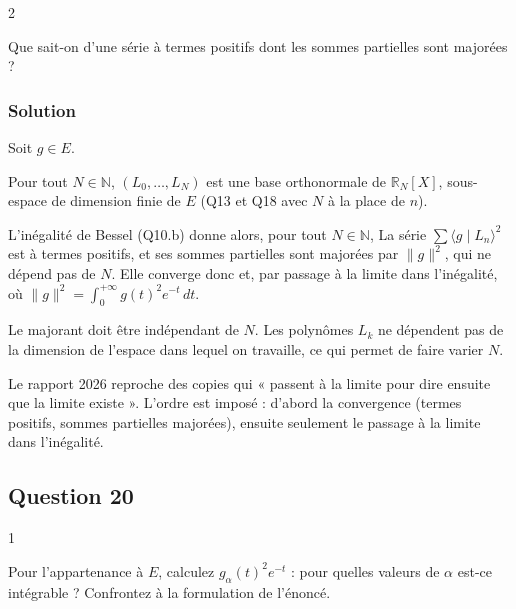 \documentclass[11pt,a4paper]{article}
\newcommand{\equationajustee}[1]{%
  \sbox{\boiteequation}{$\displaystyle #1$}%
  \ifdim\wd\boiteequation>\linewidth
    \[\resizebox{\linewidth}{!}{\usebox{\boiteequation}}\]%
  \else
    \[#1\]%
  \fi}
\begin{document}
\begin{indication}{2}

Que sait-on d'une série à termes positifs dont les sommes partielles sont majorées ?

\end{indication}

\hypertarget{solution-18}{%
\subsubsection{Solution}\label{solution-18}}

Soit \(g\in E\).

Pour tout \(N\in\mathbb N\), \((L_0,\dots,L_N)\) est une base orthonormale de \(\mathbb R_N[X]\), sous-espace de dimension finie de \(E\) (Q13 et Q18 avec \(N\) à la place de \(n\)).

L'inégalité de Bessel (Q10.b) donne alors, pour tout \(N\in\mathbb N\),
\equationajustee{\sum_{k=0}^N\langle g\mid L_k\rangle^2\le\|g\|^2.}
La série \(\sum\langle g\mid L_n\rangle^2\) est à termes positifs, et ses sommes partielles sont majorées par \(\|g\|^2\), qui ne dépend pas de \(N\). Elle converge donc et, par passage à la limite dans l'inégalité,
\equationajustee{\boxed{\sum_{n=0}^{+\infty}\langle g\mid L_n\rangle^2\le\|g\|^2,}}
où \(\|g\|^2=\int_0^{+\infty}g(t)^2e^{-t}\,dt\).

\begin{piege}

Le majorant doit être indépendant de \(N\). Les polynômes \(L_k\) ne dépendent pas de la dimension de l'espace dans lequel on travaille, ce qui permet de faire varier \(N\).

\end{piege}

\begin{jury}

Le rapport 2026 reproche des copies qui « passent à la limite pour dire ensuite que la limite existe ». L'ordre est imposé : d'abord la convergence (termes positifs, sommes partielles majorées), ensuite seulement le passage à la limite dans l'inégalité.

\end{jury}

\hypertarget{question-20}{%
\subsection{Question 20}\label{question-20}}

\begin{indication}{1}

Pour l'appartenance à \(E\), calculez \(g_\alpha(t)^2e^{-t}\) : pour quelles valeurs de \(\alpha\) est-ce intégrable ? Confrontez à la formulation de l'énoncé.

\end{indication}
\end{document}
